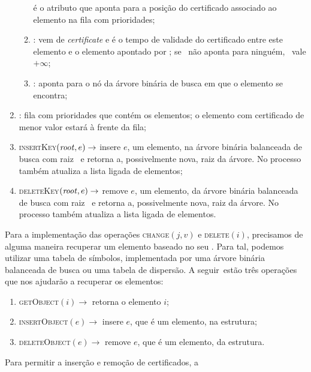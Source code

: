 \begin{enumerate}
\begin{enumerate}
                    é o atributo que aponta para a posição do
                    certificado associado ao elemento na
                    fila com prioridades;
        \item \cert: vem de \textit{certificate} e é o tempo
                    de validade do certificado entre este elemento
                    e o elemento apontado por \prev; se \prev~não
                    aponta para ninguém, \cert~vale $+\infty$;
        \item \no: aponta para o nó da árvore binária de busca
                    em que o elemento se encontra;
    \end{enumerate}
    \item \Q: fila com prioridades que contém os elementos;
            o elemento com certificado de menor valor estará
            à frente da fila;
    \item \textsc{insertKey}$(\text{\textit{root}},e)\rightarrow$ insere $e$,
                        um elemento, na árvore binária balanceada
                        de busca com raiz \raiz~e retorna a,
                        possivelmente nova, raiz da árvore.
                        No processo também atualiza a lista ligada
                        de elementos;
    \item \textsc{deleteKey}$(\text{\textit{root}},e)\rightarrow$ remove $e$,
                        um elemento, da árvore binária balanceada
                        de busca com raiz \raiz~e retorna a,
                        possivelmente nova, raiz da árvore.
                        No processo também atualiza a lista ligada
                        de elementos.
\end{enumerate}
Para a implementação das operações \textsc{change}$(j, v)$ e
\textsc{delete}$(i)$, precisamos de alguma maneira recuperar
um elemento baseado no seu \id. Para tal, podemos utilizar
uma tabela de símbolos, implementada por
uma árvore binária balanceada de busca ou uma
tabela de dispersão. A seguir~estão três operações que nos
ajudarão a recuperar os elementos:
\begin{enumerate}
    \item \textsc{getObject}$(i)\rightarrow$ retorna o
    elemento $i$;
    \item \textsc{insertObject}$(e) \rightarrow$ insere $e$,
    que é um elemento, na estrutura;
    \item \textsc{deleteObject}$(e) \rightarrow$ remove $e$,
    que é um elemento, da estrutura.
\end{enumerate}
Para permitir a inserção e remoção de certificados, a
